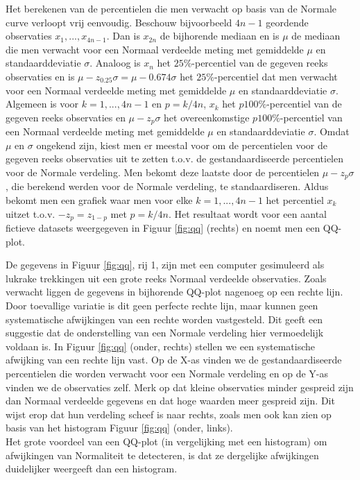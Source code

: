 \documentclass[12pt,dutch,coursenotes]{book}
\theoremstyle{definition}
\theoremstyle{definition}
\theoremstyle{definition}
\theoremstyle{remark}
\begin{document}
Het berekenen van de percentielen die men verwacht op basis van de
Normale curve verloopt vrij eenvoudig. Beschouw bijvoorbeeld \(4n-1\)
geordende observaties \(x_1,...,x_{4n-1}\). Dan is \(x_{2n}\) de
bijhorende mediaan en is \(\mu\) de mediaan die men verwacht voor een
Normaal verdeelde meting met gemiddelde \(\mu\) en standaarddeviatie
\(\sigma\). Analoog is \(x_n\) het \(25\%\)-percentiel van de gegeven
reeks observaties en is \(\mu-z_{0.25}\sigma=\mu-0.674\sigma\) het
\(25\%\)-percentiel dat men verwacht voor een Normaal verdeelde meting
met gemiddelde \(\mu\) en standaarddeviatie \(\sigma\). Algemeen is voor
\(k=1,...,4n-1\) en \(p=k/4n\), \(x_k\) het \(p 100\%\)-percentiel van
de gegeven reeks observaties en \(\mu-z_{p}\sigma\) het overeenkomstige
\(p 100\%\)-percentiel van een Normaal verdeelde meting met gemiddelde
\(\mu\) en standaarddeviatie \(\sigma\). Omdat \(\mu\) en \(\sigma\)
ongekend zijn, kiest men er meestal voor om de percentielen voor de
gegeven reeks observaties uit te zetten t.o.v. de gestandaardiseerde
percentielen voor de Normale verdeling. Men bekomt deze laatste door de
percentielen \(\mu-z_{p}\sigma\), die berekend werden voor de Normale
verdeling, te standaardiseren. Aldus bekomt men een grafiek waar men
voor elke \(k=1,...,4n-1\) het percentiel \(x_k\) uitzet t.o.v.
\(-z_{p}=z_{1-p}\) met \(p=k/4n\). Het resultaat wordt voor een aantal
fictieve datasets weergegeven in Figuur \ref{fig:qq} (rechts) en noemt
men een QQ-plot.

De gegevens in Figuur \ref{fig:qq}, rij 1, zijn met een computer
gesimuleerd als lukrake trekkingen uit een grote reeks Normaal verdeelde
observaties. Zoals verwacht liggen de gegevens in bijhorende QQ-plot
nagenoeg op een rechte lijn. Door toevallige variatie is dit geen
perfecte rechte lijn, maar kunnen geen systematische afwijkingen van een
rechte worden vastgesteld. Dit geeft een suggestie dat de onderstelling
van een Normale verdeling hier vermoedelijk voldaan is. In Figuur
\ref{fig:qq} (onder, rechts) stellen we een systematische afwijking van
een rechte lijn vast. Op de X-as vinden we de gestandaardiseerde
percentielen die worden verwacht voor een Normale verdeling en op de
Y-as vinden we de observaties zelf. Merk op dat kleine observaties
minder gespreid zijn dan Normaal verdeelde gegevens en dat hoge waarden
meer gespreid zijn. Dit wijst erop dat hun verdeling scheef is naar
rechts, zoals men ook kan zien op basis van het histogram Figuur
\ref{fig:qq} (onder, links).\\
Het grote voordeel van een QQ-plot (in vergelijking met een histogram)
om afwijkingen van Normaliteit te detecteren, is dat ze dergelijke
afwijkingen duidelijker weergeeft dan een histogram.
\end{document}
